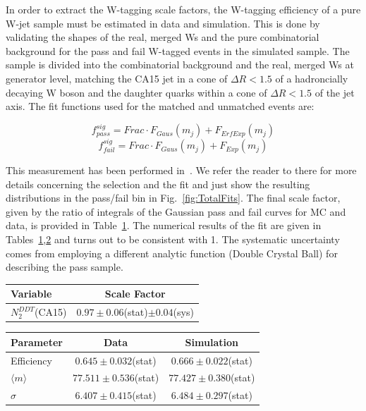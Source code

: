 In order to extract the W-tagging scale factors, the W-tagging efficiency of a pure W-jet sample must be estimated in data and simulation. This is done by validating the shapes of the real, merged Ws and the pure combinatorial background for the pass and fail W-tagged events in the \ttbar simulated sample. The \ttbar sample is divided into the combinatorial background and the real, merged Ws at generator level, matching the CA15 jet in a cone of $\Delta R <1.5$ of a hadroncially decaying W boson and the daughter quarks within a cone of $\Delta R <1.5$ of the jet axis. The fit functions used for the matched and unmatched events are:

$$f_{pass}^{sig} = Frac \cdot F_{Gaus}(m_{j}) + F_{ErfExp}(m_{j})$$
$$f_{fail}^{sig} = Frac \cdot F_{Gaus}(m_{j}) + F_{Exp}(m_{j})$$


This measurement has been performed in~\cite{N2DDTMichael}. We refer the reader to there for more details concerning the selection and the fit and just show the resulting distributions in the pass/fail bin in Fig.~\ref{fig:TotalFits}. The final scale factor, given by the ratio of integrals of the Gaussian pass and fail curves for MC and data, is provided in Table~\ref{tab:ScaleFactors}. The numerical results of the fit are given in Tables~\ref{tab:ScaleFactors},\ref{tab:FitParameters} and turns out to be consistent with 1. The systematic uncertainty comes from employing a different analytic function (Double Crystal Ball) for describing the pass sample. 

\begin{table}[htbH]
  \begin{center}
    \begin{tabular}{l|c}
      \hline
      \hline
      Variable & Scale Factor \\
      \hline
      $N_{2}^{DDT}$(CA15)     & $0.97\pm0.06$(stat)$\pm0.04$(sys)  \\
      \hline
      \hline
    \end{tabular}
    \label{tab:ScaleFactors}
  \end{center}
\end{table}

\begin{table}[htbH]
  \begin{center}
    \begin{tabular}{l|c|c}
      \hline
      \hline
      Parameter & Data & Simulation \\
      \hline
      Efficiency          & $0.645\pm0.032$(stat)  & $0.666\pm0.022$(stat)  \\
      $\langle m \rangle$ & $77.511\pm0.536$(stat) & $77.427\pm0.380$(stat) \\
      $\sigma$            & $6.407\pm0.415$(stat)  & $6.484\pm0.297$(stat)  \\
      \hline
      \hline
    \end{tabular}
    \label{tab:FitParameters}
  \end{center}
\end{table}

